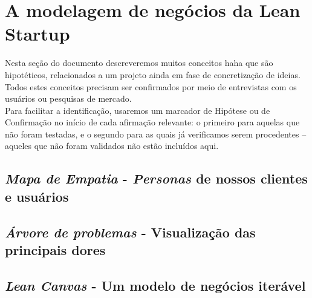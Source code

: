 \documentclass[12pt,a4paper,twoside,hyphens,english,brazil]{abntex2}
\newcommand{\hip}{{\color{BlueViolet}\framebox[1.1\width]{HIP}}}
\newcommand{\conf}{{\color{OliveGreen}\framebox[1.1\width]{CNF}}}
\begin{document}

\section{A modelagem de negócios da Lean Startup}

Nesta seção do documento descreveremos muitos conceitos haha que são hipotéticos, relacionados a um projeto ainda em fase de concretização de ideias. Todos estes conceitos precisam ser confirmados por meio de entrevistas com os usuários ou pesquisas de mercado.\\
Para facilitar a identificação, usaremos um marcador de Hipótese \hip{} ou de Confirmação \conf{} no início de cada afirmação relevante: o primeiro para aquelas que não foram testadas, e o segundo para as quais já verificamos serem procedentes -- aqueles que não foram validados não estão incluídos aqui.


\subsection{\emph{Mapa de Empatia} - \emph{Personas} de nossos clientes e usuários}


\subsection{\emph{Árvore de problemas} - Visualização das principais dores}

\subsection{\emph{Lean Canvas} - Um modelo de negócios iterável}
\end{document}
